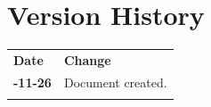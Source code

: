 \documentclass[11pt,a4paper]{article}
\theoremstyle{definition}
\begin{document}
\section*{Version History}

\begin{center}
\begingroup
\small
{}
\begin{tabularx}{\textwidth}{>{\bfseries}l >{\raggedright\arraybackslash}X}
\arrayrulecolor{primaryblue}\toprule[1.2pt]
\rowcolor{primaryblue!10}
\textcolor{primaryblue}{\textbf{Date}} & \textcolor{primaryblue}{\textbf{Change}} \\
\arrayrulecolor{codeframe}\midrule[0.6pt]
2026-11-26 & Document created. \\
\arrayrulecolor{primaryblue}\bottomrule[1.2pt]
\end{tabularx}
\endgroup
\end{center}
\end{document}
